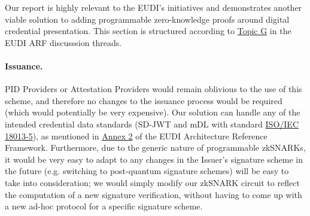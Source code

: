 

Our report is highly relevant to the EUDI's initiatives and demonstrates another viable solution to adding programmable zero-knowledge proofs around digital credential presentation. 
This section is structured according to \href{https://github.com/eu-digital-identity-wallet/eudi-doc-architecture-and-reference-framework/blob/main/docs/discussion-topics/g-zero-knowledge-proof.md}{Topic G} in the EUDI ARF discusssion threads.

\paragraph{Issuance.} PID Providers or Attestation Providers would remain oblivious to the use of this scheme, and therefore no changes to the issuance process would be required (which would potentially be very expensive).
Our solution can handle any of the intended credential data standards (SD-JWT and mDL with standard \href{https://mobiledl-e5018.web.app/ISO_18013-5_E_draft.pdf}{ISO/IEC 18013-5}), 
as mentioned in \href{https://eu-digital-identity-wallet.github.io/eudi-doc-architecture-and-reference-framework/1.4.0/annexes/annex-2/annex-2-high-level-requirements/}{Annex 2} of the EUDI Architecture Reference Framework.
Furthermore, due to the generic nature of programmable zkSNARKs, it would be very easy to adapt to any changes in the Issuer's signature scheme in the future (e.g. switching to post-quantum signature schemes) will be easy to take into consideration;
we would simply modify our zkSNARK circuit to reflect the computation of a new signature verification, without having to come up with a new ad-hoc protocol for a specific signature scheme.  

